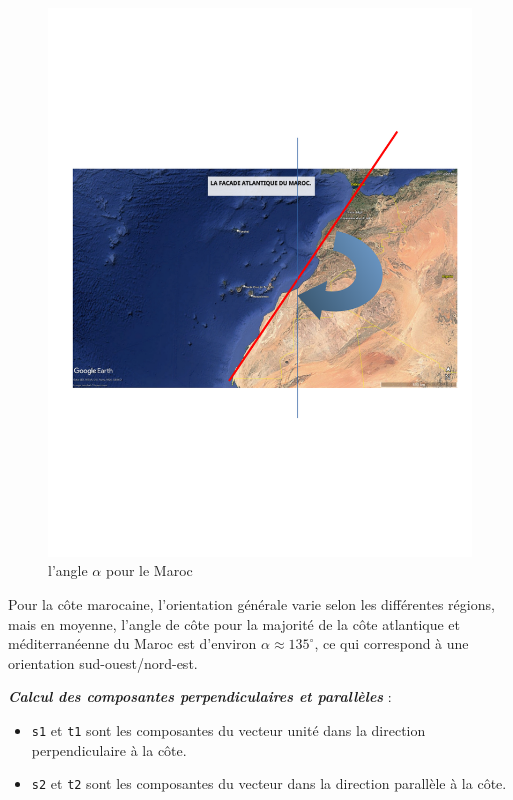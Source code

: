 \begin{figure}[H]
\centering
\includegraphics[scale=0.5]{angle.png}
\caption{l'angle $\alpha$ pour le Maroc}
\end{figure}

Pour la côte marocaine, l'orientation générale varie selon les différentes régions, mais en moyenne, l'angle de côte pour la majorité de la côte atlantique et méditerranéenne du Maroc est d'environ $\alpha \approx 135^\circ$, ce qui correspond à une orientation sud-ouest/nord-est.
\vspace{1cm}


\textbf{\textit{Calcul des composantes perpendiculaires et parallèles}} : \\
   \begin{itemize}
       \item \texttt{s1} et \texttt{t1} sont les composantes du vecteur unité dans la direction perpendiculaire à la côte.
       \item \texttt{s2} et \texttt{t2} sont les composantes du vecteur dans la direction parallèle à la côte.
   \end{itemize}

